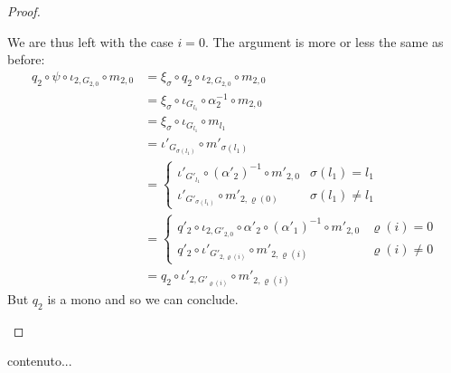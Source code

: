 \begin{proof}
\begin{enumerate}
	 We are thus left with the case $i=0$. The argument is more or less the same as before:
	 \begin{align*}
	 	q_2\circ \psi \circ \iota_{2, G_{2,0}}\circ m_{2,0}&=\xi_\sigma \circ q_2\circ \iota_{2, G_{2,0}}\circ m_{2,0}\\&=\xi_\sigma \circ \iota_{G_{l_1}}\circ \alpha^{-1}_2\circ m_{2,0}\\&=\xi_\sigma \circ \iota_{ G_{l_1}}\circ m_{l_1}\\&=\iota'_{G_{\sigma(l_1)}}\circ m'_{\sigma(l_1)}\\&=\begin{cases}
	 		\iota'_{G'_{l_1}}\circ (\alpha'_2)^{-1} \circ m'_{2, 0}  &\sigma(l_1) = l_1\\
	 		\iota'_{G'_{\sigma(l_1)}}\circ m'_{2,\varrho(0)} & \sigma(l_1)\neq l_1
	 	\end{cases}
	 	\\&=\begin{cases}
	 		q'_2\circ \iota_{2, G'_{2,0}} \circ \alpha'_2\circ  (\alpha'_1)^{-1} \circ m'_{2, 0}& \varrho(i)=0\\
	 		q'_2\circ \iota'_{G'_{2, \varrho(i)}} \circ m'_{2,\varrho(i)} & \varrho(i)\neq 0
	 	\end{cases}\\&=q_2\circ \iota'_{2, G'_{\varrho(i)}}\circ m'_{2, \varrho(i)}
	 \end{align*}
	 But $q_2$ is a mono and so we can conclude.	  \qedhere 
	\end{enumerate}
\end{proof}

\begin{corollary}\label{cor:epi}
	contenuto...
\end{corollary}

